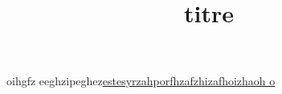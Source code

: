 \documentclass{article}
\title{titre}
\begin{document}
\maketitlehfe oihgfz eeghzipeghez\underline{es\color{red}tesyrzahporfhzafzhizafhoizhaoh o}
\end{document}
